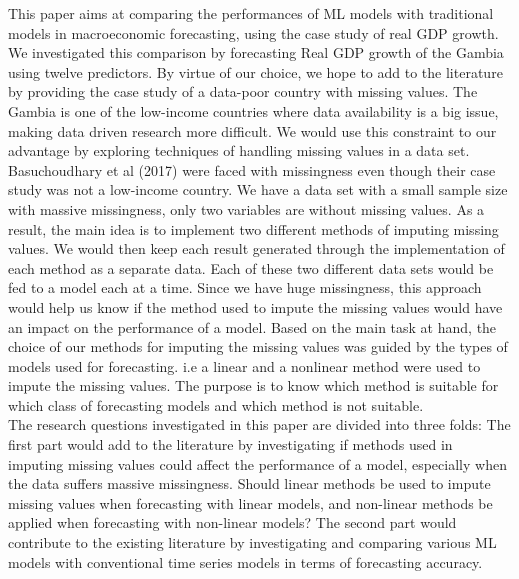 \documentclass[12pt,italian, twoside]{report}
\begin{document}
This paper aims at comparing the performances of ML models with traditional models in macroeconomic forecasting, using the case study of real GDP growth. We investigated this comparison by forecasting Real GDP growth of the Gambia using twelve predictors. By virtue of our choice, we hope to add to the literature by providing the case study of a data-poor country with missing values. The Gambia is one of the low-income countries where data availability is a big issue, making data driven research more difficult. We would use this constraint to our advantage by exploring techniques of handling missing values in a data set. Basuchoudhary et al (2017) were faced with missingness even though their case study was not a low-income country. We have a data set with a small sample size with massive missingness, only two variables are without missing values. As a result, the main idea is to implement two different methods of imputing missing values. We would then keep each result generated through the implementation of each method as a separate data. Each of these two different data sets would be fed to a model each at a time. Since we have huge missingness, this approach would help us know if the method used to impute the missing values would have an impact on the performance of a model. Based on the main task at hand, the choice of our methods for imputing the missing values was guided by the types of models used for forecasting. i.e a linear and a nonlinear method were used to impute the missing values. The purpose is to know which method is suitable for which class of forecasting models and which method is not suitable.
\\
The research questions investigated in this paper are divided into three folds: The first part would add to the literature by investigating if methods used in imputing missing values could affect the performance of a model, especially when the data suffers massive missingness. Should linear methods be used to impute missing values when forecasting with linear models, and non-linear methods be applied when forecasting with non-linear models? The second part would contribute to the existing literature by investigating and comparing various ML models with conventional time series models in terms of forecasting accuracy.
\\
\end{document}
